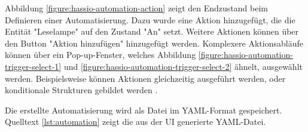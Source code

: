 Abbildung \ref{figure:hassio-automation-action} zeigt den Endzustand beim Definieren einer Automatisierung. Dazu wurde eine Aktion hinzugefügt, die die Entität "Leselampe" auf den Zustand "An" setzt. Weitere Aktionen können über den Button "Aktion hinzufügen" hinzugefügt werden. Komplexere Aktionsabläufe können über ein Pop-up-Fenster, welches Abbildung \ref{figure:hassio-automation-trigger-select-1} und \ref{figure:hassio-automation-trigger-select-2} ähnelt, ausgewählt werden. Beispielsweise können Aktionen gleichzeitig ausgeführt werden, oder konditionale Strukturen gebildet werden \parencite{homeassistantScriptSyntax}.



Die erstellte Automatisierung wird als Datei im \ac{YAML}-Format gespeichert. Quelltext \ref{lst:automation} zeigt die aus der UI generierte \ac{YAML}-Datei. 
